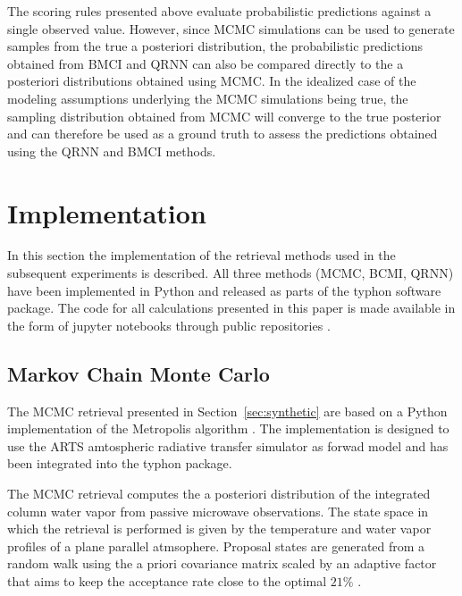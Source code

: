 \documentclass[journal abbreviation, manuscript]{copernicus}
\begin{document}
  The scoring rules presented above evaluate probabilistic predictions against a
  single observed value. However, since MCMC simulations can be used to generate
  samples from the true a posteriori distribution, the probabilistic predictions
  obtained from BMCI and QRNN can also be compared directly to the a posteriori
  distributions obtained using MCMC. In the idealized case of the modeling
  assumptions underlying the MCMC simulations being true, the sampling
  distribution obtained from MCMC will converge to the true posterior and can
  therefore be used as a ground truth to assess the predictions obtained using
  the QRNN and BMCI methods.

\section{Implementation}
\label{sec:implementation}

  In this section the implementation of the retrieval methods used in the
  subsequent experiments is described. All three methods (MCMC, BCMI, QRNN) have
  been implemented in Python \citep{python} and released as parts of the typhon
  \citep{typhon} software package. The code for all calculations presented in
  this paper is made available in the form of jupyter notebooks through public
  repositories \citep{predictive_uncertainty, smhi}.

\subsection{Markov Chain Monte Carlo}

   The MCMC retrieval presented in Section~\ref{sec:synthetic} are based on
   a Python implementation of the Metropolis algorithm \citep[Ch. 12]{bda}.
   The implementation is designed to use the ARTS amtospheric radiative
   transfer simulator \citep{arts_1, arts_2} as forwad model and has been
   integrated into the typhon package.

   The MCMC retrieval computes the a posteriori distribution of the integrated
   column water vapor from passive microwave observations. The state space in
   which the retrieval is performed is given by the temperature and water vapor
   profiles of a plane parallel atmsophere. Proposal states are generated from a
   random walk using the a priori covariance matrix scaled by an adaptive factor
   that aims to keep the acceptance rate close to the optimal $21\%$
   \citep{bda}.
\end{document}
